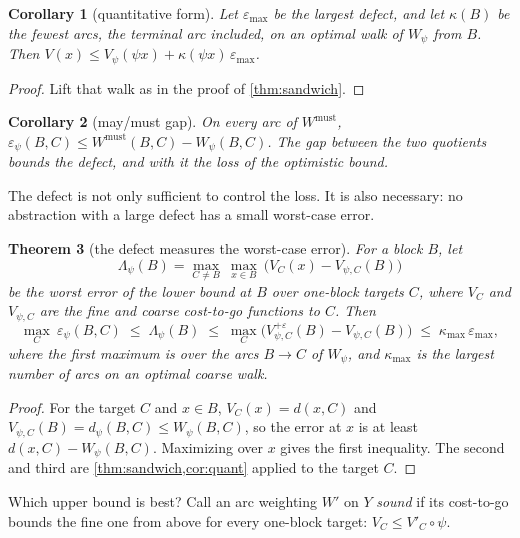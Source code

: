 \documentclass[11pt]{article}
\newtheorem{theorem}{Theorem}[section]
\newtheorem{corollary}[theorem]{Corollary}
\theoremstyle{definition}
\theoremstyle{remark}
\newcommand{\eps}{\varepsilon}
\newcommand{\dd}{d}
\newcommand{\Wm}{W^{\mathrm{must}}}
\begin{document}
\begin{corollary}[quantitative form]\label{cor:quant}
Let $\eps_{\max}$ be the largest defect, and let $\kappa(B)$ be the fewest arcs,
the terminal arc included, on an optimal walk of $W_\psi$ from $B$. Then
$V(x) \le V_\psi(\psi x) + \kappa(\psi x)\,\eps_{\max}$.
\end{corollary}
\begin{proof}
Lift that walk as in the proof of \cref{thm:sandwich}.
\end{proof}

\begin{corollary}[may/must gap]\label{cor:gap}
On every arc of $\Wm$, $\eps_\psi(B,C) \le \Wm(B,C) - W_\psi(B,C)$. The gap between
the two quotients bounds the defect, and with it the loss of the optimistic bound.
\end{corollary}

The defect is not only sufficient to control the loss. It is also necessary: no
abstraction with a large defect has a small worst-case error.

\begin{theorem}[the defect measures the worst-case error]\label{thm:twosided}
For a block $B$, let
\[
\Lambda_\psi(B) = \max_{C \ne B}\ \max_{x \in B}\ \big(V_C(x) - V_{\psi,C}(B)\big)
\]
be the worst error of the lower bound at $B$ over one-block targets $C$, where
$V_C$ and $V_{\psi,C}$ are the fine and coarse cost-to-go functions to $C$. Then
\[
\max_{C}\ \eps_\psi(B,C) \;\le\; \Lambda_\psi(B) \;\le\;
\max_{C}\big(V^{+\eps}_{\psi,C}(B) - V_{\psi,C}(B)\big) \;\le\; \kappa_{\max}\,
\eps_{\max},
\]
where the first maximum is over the arcs $B \to C$ of $W_\psi$, and $\kappa_{\max}$
is the largest number of arcs on an optimal coarse walk.
\end{theorem}
\begin{proof}
For the target $C$ and $x \in B$, $V_C(x) = \dd(x, C)$ and
$V_{\psi,C}(B) = \dd_\psi(B, C) \le W_\psi(B,C)$, so the error at $x$ is at least
$\dd(x,C) - W_\psi(B,C)$. Maximizing over $x$ gives the first inequality. The
second and third are \cref{thm:sandwich,cor:quant} applied to the target $C$.
\end{proof}

Which upper bound is best? Call an arc weighting $W'$ on $Y$ \emph{sound} if its
cost-to-go bounds the fine one from above for every one-block target:
$V_C \le V'_C \circ \psi$.
\end{document}
